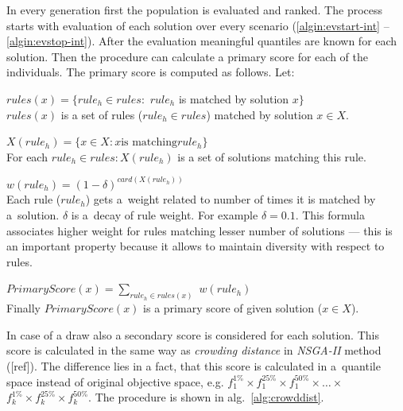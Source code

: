 In every generation first the population is evaluated and ranked. The process
starts with evaluation of each solution over every scenario
(\ref{algin:evstart-int} -- \ref{algin:evstop-int}). After the evaluation
meaningful quantiles are known for each solution. Then the procedure can
calculate a primary score for each of the individuals. The primary score is
computed as follows. Let:

\begin{description}
\item $\textit{rules}(x) = \{\textit{rule}_h \in \textit{rules} :$
$\textit{rule}_h$ is matched by solution $x\}$ \\
$\textit{rules}(x)$ is a set of rules ($\textit{rule}_h \in \textit{rules}$)
matched by solution $x \in X$. 

\item $X(\textit{rule}_h) = \{x \in X: x \text{is matching} \textit{rule}_h\}$
\\ For each $\textit{rule}_h \in rules: X(\textit{rule}_h)$ is a set of
solutions matching this rule.

\item $w(\textit{rule}_h) = (1 - \delta)^{\textit{card}(X(\textit{rule}_h))}$
  \\ Each rule ($\textit{rule}_h$) gets a~weight related to number of times it
  is matched by a~solution. $\delta$ is a~decay of rule weight. For example
  $\delta = 0.1$. This formula associates higher weight for rules matching
  lesser number of solutions --- this is an important property because it
  allows to maintain diversity with respect to rules.

\item $\textit{PrimaryScore}(x) = \sum_{\textit{rule}_h \in rules(x)}$
  $w(\textit{rule}_h)$ \\
Finally $\textit{PrimaryScore}(x)$ is a primary score of given solution ($x \in X$).
\end{description}

In case of a draw also a secondary score is considered for each solution. This
score is calculated in the same way as \textit{crowding distance} in
\textit{NSGA-II} method ([ref]). The difference lies in a fact, that this
score is calculated in a~quantile space instead of original objective space,
e.g. $f^{1\%}_1 \times f^{25\%}_1 \times f^{50\%}_1 \times \dots \times $
$f^{1\%}_k \times f^{25\%}_k \times f^{50\%}_k$. The procedure is shown in
alg.~\ref{alg:crowddist}.

